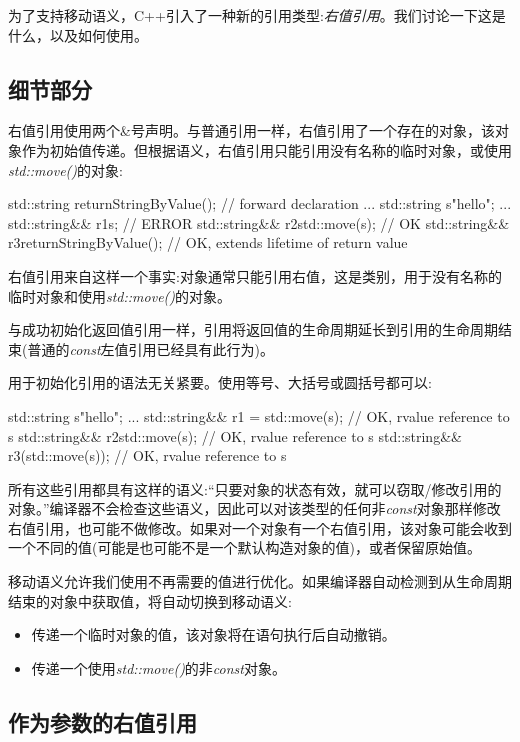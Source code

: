 
为了支持移动语义，C++引入了一种新的引用类型:\textit{右值引用}。我们讨论一下这是什么，以及如何使用。

\subsection{细节部分}

右值引用使用两个\&号声明。与普通引用一样，右值引用了一个存在的对象，该对象作为初始值传递。但根据语义，右值引用只能引用没有名称的临时对象，或使用\textit{std::move()}的对象:

\begin{cppcode}
std::string returnStringByValue(); // forward declaration
...
std::string s{"hello"};
...
std::string&& r1{s}; // ERROR
std::string&& r2{std::move(s)}; // OK
std::string&& r3{returnStringByValue()}; // OK, extends lifetime of return value
\end{cppcode}

右值引用来自这样一个事实:对象通常只能引用右值，这是类别，用于没有名称的临时对象和使用\textit{std::move()}的对象。

与成功初始化返回值引用一样，引用将返回值的生命周期延长到引用的生命周期结束(普通的\textit{const}左值引用已经具有此行为)。

用于初始化引用的语法无关紧要。使用等号、大括号或圆括号都可以:

\begin{cppcode}
std::string s{"hello"};
...
std::string&& r1 = std::move(s); // OK, rvalue reference to s
std::string&& r2{std::move(s)}; // OK, rvalue reference to s
std::string&& r3(std::move(s)); // OK, rvalue reference to s
\end{cppcode}

所有这些引用都具有这样的语义:“只要对象的状态有效，就可以窃取/修改引用的对象。”编译器不会检查这些语义，因此可以对该类型的任何非\textit{const}对象那样修改右值引用，也可能不做修改。如果对一个对象有一个右值引用，该对象可能会收到一个不同的值(可能是也可能不是一个默认构造对象的值)，或者保留原始值。

移动语义允许我们使用不再需要的值进行优化。如果编译器自动检测到从生命周期结束的对象中获取值，将自动切换到移动语义:

\begin{itemize}
	\item 传递一个临时对象的值，该对象将在语句执行后自动撤销。
	\item 传递一个使用\textit{std::move()}的非\textit{const}对象。
\end{itemize}

\subsection{作为参数的右值引用}

